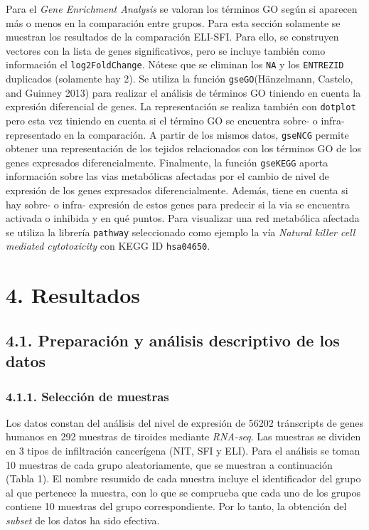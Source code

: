 \documentclass[
]{article}
\begin{document}
Para el \emph{Gene Enrichment Analysis} se valoran los términos GO según
si aparecen más o menos en la comparación entre grupos. Para esta
sección solamente se muestran los resultados de la comparación ELI-SFI.
Para ello, se construyen vectores con la lista de genes significativos,
pero se incluye también como información el \texttt{log2FoldChange}.
Nótese que se eliminan los \texttt{NA} y los \texttt{ENTREZID}
duplicados (solamente hay 2). Se utiliza la función
\texttt{gseGO}(Hänzelmann, Castelo, and Guinney 2013) para realizar el
análisis de términos GO tiniendo en cuenta la expresión diferencial de
genes. La representación se realiza también con \texttt{dotplot} pero
esta vez tiniendo en cuenta si el término GO se encuentra sobre- o
infra- representado en la comparación. A partir de los mismos datos,
\texttt{gseNCG} permite obtener una representación de los tejidos
relacionados con los términos GO de los genes expresados
diferencialmente. Finalmente, la función \texttt{gseKEGG} aporta
información sobre las vias metabólicas afectadas por el cambio de nivel
de expresión de los genes expresados diferencialmente. Además, tiene en
cuenta si hay sobre- o infra- expresión de estos genes para predecir si
la via se encuentra activada o inhibida y en qué puntos. Para visualizar
una red metabólica afectada se utiliza la librería \texttt{pathway}
seleccionado como ejemplo la vía \emph{Natural killer cell mediated
cytotoxicity} con KEGG ID \texttt{hsa04650}.

\newpage

\hypertarget{resultados}{%
\section{4. Resultados}\label{resultados}}

\hypertarget{preparaciuxf3n-y-anuxe1lisis-descriptivo-de-los-datos}{%
\subsection{4.1. Preparación y análisis descriptivo de los
datos}\label{preparaciuxf3n-y-anuxe1lisis-descriptivo-de-los-datos}}

\hypertarget{selecciuxf3n-de-muestras}{%
\subsubsection{4.1.1. Selección de
muestras}\label{selecciuxf3n-de-muestras}}

Los datos constan del análisis del nivel de expresión de 56202
tránscripts de genes humanos en 292 muestras de tiroides mediante
\emph{RNA-seq}. Las muestras se dividen en 3 tipos de infiltración
cancerígena (NIT, SFI y ELI). Para el análisis se toman 10 muestras de
cada grupo aleatoriamente, que se muestran a continuación (Tabla 1). El
nombre resumido de cada muestra incluye el identificador del grupo al
que pertenece la muestra, con lo que se comprueba que cada uno de los
grupos contiene 10 muestras del grupo correspondiente. Por lo tanto, la
obtención del \emph{subset} de los datos ha sido efectiva.
\end{document}
